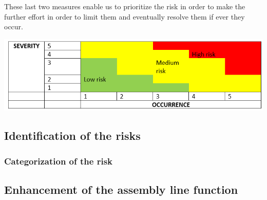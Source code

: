 These last two measures enable us to prioritize the risk in order to make the further effort in order to limit them and eventually resolve them if ever they occur.

\includegraphics{Img/img-risk.png}

\subsection{Identification of the risks}
\subsubsection{Categorization of the risk}
\subsection{Enhancement of the assembly line function}